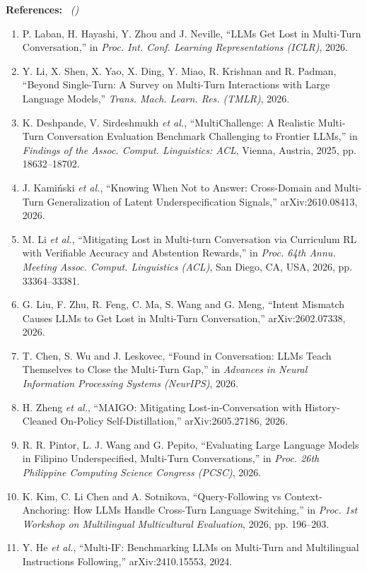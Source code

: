 \documentclass[11pt,a4paper]{article}
\newcommand{\formitem}[3]{%
  \par\vspace{4pt}\noindent\makebox[1.6em][l]{\textbf{#1.}}\textbf{#2}%
  \if\relax\detokenize{#3}\relax\else\ \textit{(#3)}\fi\par}
\begin{document}
\formitem{11}{References:}{}
\begin{enumerate}[label={\arabic*.},leftmargin=2em,itemsep=1pt,topsep=2pt]\small\raggedright
\item P. Laban, H. Hayashi, Y. Zhou and J. Neville, ``LLMs Get Lost in Multi-Turn Conversation,'' in \textit{Proc. Int. Conf. Learning Representations (ICLR)}, 2026.
\item Y. Li, X. Shen, X. Yao, X. Ding, Y. Miao, R. Krishnan and R. Padman, ``Beyond Single-Turn: A Survey on Multi-Turn Interactions with Large Language Models,'' \textit{Trans. Mach. Learn. Res. (TMLR)}, 2026.
\item K. Deshpande, V. Sirdeshmukh \textit{et al.}, ``MultiChallenge: A Realistic Multi-Turn Conversation Evaluation Benchmark Challenging to Frontier LLMs,'' in \textit{Findings of the Assoc. Comput. Linguistics: ACL}, Vienna, Austria, 2025, pp. 18632--18702.
\item J. Kami\'nski \textit{et al.}, ``Knowing When Not to Answer: Cross-Domain and Multi-Turn Generalization of Latent Underspecification Signals,'' arXiv:2610.08413, 2026.
\item M. Li \textit{et al.}, ``Mitigating Lost in Multi-turn Conversation via Curriculum RL with Verifiable Accuracy and Abstention Rewards,'' in \textit{Proc. 64th Annu. Meeting Assoc. Comput. Linguistics (ACL)}, San Diego, CA, USA, 2026, pp. 33364--33381.
\item G. Liu, F. Zhu, R. Feng, C. Ma, S. Wang and G. Meng, ``Intent Mismatch Causes LLMs to Get Lost in Multi-Turn Conversation,'' arXiv:2602.07338, 2026.
\item T. Chen, S. Wu and J. Leskovec, ``Found in Conversation: LLMs Teach Themselves to Close the Multi-Turn Gap,'' in \textit{Advances in Neural Information Processing Systems (NeurIPS)}, 2026.
\item H. Zheng \textit{et al.}, ``MAIGO: Mitigating Lost-in-Conversation with History-Cleaned On-Policy Self-Distillation,'' arXiv:2605.27186, 2026.
\item R. R. Pintor, L. J. Wang and G. Pepito, ``Evaluating Large Language Models in Filipino Underspecified, Multi-Turn Conversations,'' in \textit{Proc. 26th Philippine Computing Science Congress (PCSC)}, 2026.
\item K. Kim, C. Li Chen and A. Sotnikova, ``Query-Following vs Context-Anchoring: How LLMs Handle Cross-Turn Language Switching,'' in \textit{Proc. 1st Workshop on Multilingual Multicultural Evaluation}, 2026, pp. 196--203.
\item Y. He \textit{et al.}, ``Multi-IF: Benchmarking LLMs on Multi-Turn and Multilingual Instructions Following,'' arXiv:2410.15553, 2024.

\end{enumerate}
\end{document}
